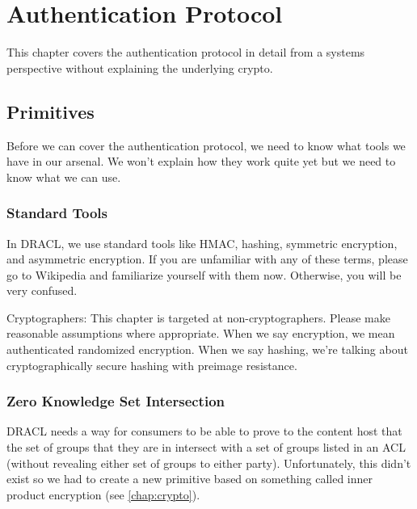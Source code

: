 \documentclass[pdftex,12pt,a4papaer,twoside,notitlepage]{report}
\DeclareMathOperator{\Vvec}{\mathtt{Verifier}}
\DeclareMathOperator{\PvecP}{\mathtt{ProverPublic}}
\DeclareMathOperator{\PvecS}{\mathtt{ProverPrivate}}
\DeclareMathOperator{\PvecG}{\mathtt{ProverGenerator}}
\DeclareMathOperator{\Cvec}{\mathtt{Challenge}}
\DeclareMathOperator{\mCvec}{\mathtt{MakeChallenge}}
\begin{document}
\chapter{Authentication Protocol}
\label{chap:auth}

\newcommand{\Vv}{\Vvec(\mathbb{A})}
\newcommand{\Cv}{\Cvec(s_1, \mathbb{B})}
\newcommand{\mCv}{\mCvec(s_1, \Pv)}
\newcommand{\Pv}{\PvecP(\mathbb{B})}
\newcommand{\Sv}{\PvecS(\mathbb{B})}
\newcommand{\Pvg}{\PvecG(\mathbb{B})}

This chapter covers the authentication protocol in detail from a systems
perspective without explaining the underlying crypto.

\section{Primitives}

Before we can cover the authentication protocol, we need to know what tools we
have in our arsenal. We won't explain how they work quite yet but we need to
know what we can use.

\subsection{Standard Tools}

In DRACL, we use standard tools like HMAC, hashing, symmetric encryption, and
asymmetric encryption. If you are unfamiliar with any of these terms, please go
to Wikipedia and familiarize yourself with them now. Otherwise, you will be very
confused.

Cryptographers: This chapter is targeted at non-cryptographers. Please make
reasonable assumptions where appropriate. When we say encryption, we mean
authenticated randomized encryption. When we say hashing, we're talking about
cryptographically secure hashing with preimage resistance.

\subsection{Zero Knowledge Set Intersection}

DRACL needs a way for consumers to be able to prove to the content host that the
set of groups that they are in intersect with a set of groups listed in an ACL
(without revealing either set of groups to either party). Unfortunately, this
didn't exist so we had to create a new primitive based on something called inner
product encryption (see \cref{chap:crypto}).
\end{document}

